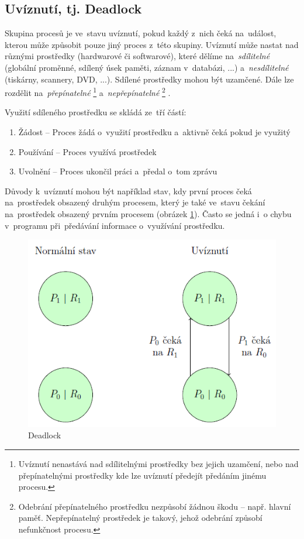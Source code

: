 \subsection{Uvíznutí, tj. Deadlock}

Skupina procesů je ve~stavu uvíznutí, pokud každý z~nich čeká na~událost, kterou může způsobit pouze jiný proces z~této skupiny. Uvíznutí může nastat nad různými prostředky (hardwarové či softwarové), které dělíme na~\emph{sdílitelné} (globální proměnné, sdílený úsek paměti, záznam v~databázi, ...) a~\emph{nesdílitelné} (tiskárny, scannery, DVD, ...). Sdílené prostředky mohou být uzamčené. Dále lze rozdělit na~\emph{přepínatelné}%
\footnote{Uvíznutí nenastává nad sdílitelnými prostředky bez jejich uzamčení, nebo nad přepínatelnými prostředky kde lze uvíznutí předejít předáním jinému procesu.} %
a~\emph{nepřepínatelné}%
\footnote{Odebrání přepínatelného prostředku nezpůsobí žádnou škodu -- např. hlavní paměť. Nepřepínatelný prostředek je takový, jehož odebrání způsobí nefunkčnost procesu.}%
.

Využití sdíleného prostředku se skládá ze~tří částí:

\begin{enumerate}
	\item Žádost -- Proces žádá o~využití prostředku a~aktivně čeká pokud je využitý
	\item Používání -- Proces využívá prostředek
	\item Uvolnění -- Proces ukončil práci a~předal o~tom zprávu
\end{enumerate}

Důvody k~uvíznutí mohou být například stav, kdy první proces čeká na~prostředek obsazený druhým procesem, který je také ve~stavu čekání na~prostředek obsazený prvním procesem (obrázek \ref{proc_deadlock}). Často se jedná i~o chybu v~programu při~předávání informace o~využívání prostředku.

\begin{figure}[ht]
	\centering
	\includegraphics[scale=0.5]{images/proc_deadlock.png}
	\caption{Deadlock}
	\label{proc_deadlock}
\end{figure}

